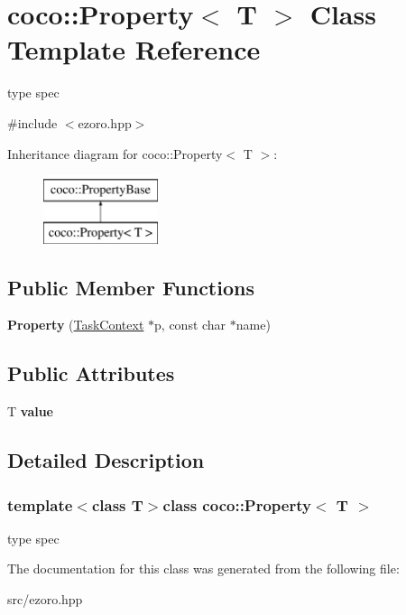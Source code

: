 \hypertarget{classcoco_1_1_property}{\section{coco\-:\-:Property$<$ T $>$ Class Template Reference}
\label{classcoco_1_1_property}
}


type spec  




{\ttfamily \#include $<$ezoro.\-hpp$>$}

Inheritance diagram for coco\-:\-:Property$<$ T $>$\-:\begin{figure}[H]
\begin{center}
\leavevmode
\includegraphics[height=2.000000cm]{classcoco_1_1_property}
\end{center}
\end{figure}
\subsection*{Public Member Functions}
\begin{DoxyCompactItemize}
\item 
\hypertarget{classcoco_1_1_property_a91fc8f78041a705165eab964224cf1cc}{{\bfseries Property} (\hyperlink{classcoco_1_1_task_context}{Task\-Context} $\ast$p, const char $\ast$name)}\label{classcoco_1_1_property_a91fc8f78041a705165eab964224cf1cc}

\end{DoxyCompactItemize}
\subsection*{Public Attributes}
\begin{DoxyCompactItemize}
\item 
\hypertarget{classcoco_1_1_property_aa3f12df16e1c74988ea9563d4a70afac}{T {\bfseries value}}\label{classcoco_1_1_property_aa3f12df16e1c74988ea9563d4a70afac}

\end{DoxyCompactItemize}


\subsection{Detailed Description}
\subsubsection*{template$<$class T$>$class coco\-::\-Property$<$ T $>$}

type spec 

The documentation for this class was generated from the following file\-:\begin{DoxyCompactItemize}
\item 
src/ezoro.\-hpp\end{DoxyCompactItemize}
